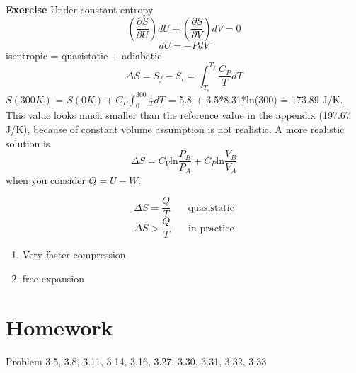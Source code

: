{\bf Exercise}
Under constant entropy
\begin{equation} (\frac{\partial S}{\partial U})dU + (\frac{\partial S}{\partial V})dV = 0 \end{equation}
\begin{equation} dU = -PdV \end{equation}
isentropic = quasistatic + adiabatic \\
\begin{equation} \Delta{S} = S_f-S_i = \int^{T_f}_{T_i} \frac{C_P}{T} dT \end{equation}
$S(300K)$ = $S(0K) + C_P \int^{300}_{0} \frac{1}{T} dT$ = 5.8 + 3.5*8.31*ln(300) = 173.89 J/K.\\
This value looks much smaller than the reference value in the appendix (197.67 J/K), because of constant volume assumption is not realistic.
A more realistic solution is
\begin{equation} \Delta{S} = C_V\text{ln}\frac{P_B}{P_A} + C_P\text{ln}\frac{V_B}{V_A}\end{equation}
when you consider $Q = U-W$.

\begin{equation} \Delta{S} = \frac{Q}{T} ~~~~~~~~\text{quasistatic}\end{equation}
\begin{equation} \Delta{S} > \frac{Q}{T} ~~~~~~~~\text{in practice}\end{equation}

\begin{enumerate}
\item Very faster compression
\item free expansion
\end{enumerate}



\section{Homework}
Problem  3.5, 3.8, 3.11, 3.14, 3.16, 3.27, 3.30, 3.31, 3.32, 3.33


